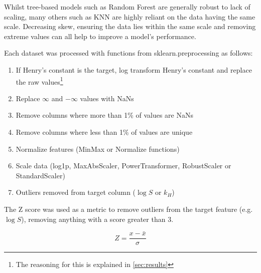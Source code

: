 \documentclass[11pt, titlepage]{article}
\begin{document}
Whilst tree-based models such as Random Forest are generally robust to lack of scaling, many others such as KNN are highly reliant on the data having the same scale\cite{KuhnJohnson}. Decreasing skew, ensuring the data lies within the same scale and removing extreme values can all help to improve a model's performance.

Each dataset was processed with functions from sklearn.preprocessing\cite{Scalers} as follows:

\begin{enumerate}
	\item If Henry's constant is the target, log transform Henry's constant and replace the raw values\footnote{The reasoning for this is explained in \ref{sec:results}}
	\item Replace $\infty$ and $-\infty$ values with NaNs
	\item Remove columns where more than 1\% of values are NaNs
	\item Remove columns where less than 1\% of values are unique
	\item Normalize features (MinMax or Normalize functions)
	\item Scale data (log1p, MaxAbsScaler, PowerTransformer, RobustScaler or StandardScaler)
	\item Outliers removed from target column ({$\log S$} or {$k_H$})
\end{enumerate}

The Z score was used as a metric to remove outliers from the target feature (e.g. $\log S$), removing anything with a score greater than 3.

\begin{equation}
Z = \frac{x - \bar{x}}{\sigma}
\end{equation}
\end{document}
